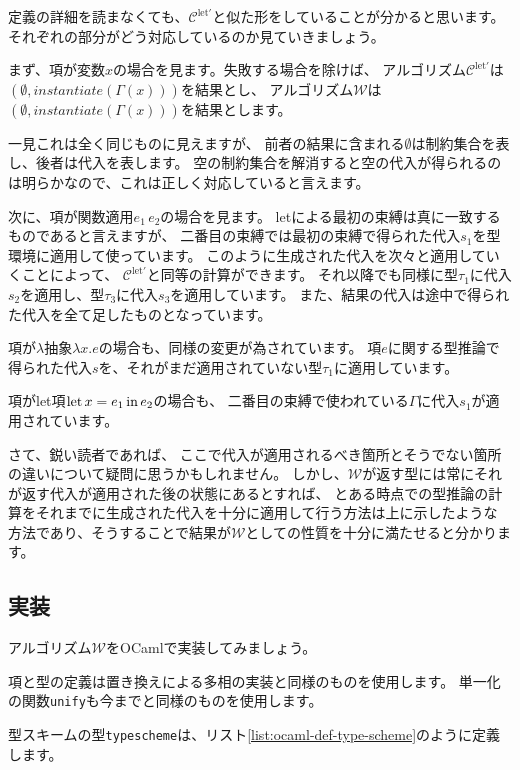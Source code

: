 定義の詳細を読まなくても、$\mathcal C^\mathrm{let'}$と似た形をしていることが分かると思います。
それぞれの部分がどう対応しているのか見ていきましょう。

まず、項が変数$x$の場合を見ます。失敗する場合を除けば、
アルゴリズム$\mathcal C^\mathrm{let'}$は$(\emptyset,\mathit{instantiate}(\Gamma(x)))$を結果とし、
アルゴリズム$\mathcal W$は$(\emptyset, \mathit{instantiate}(\Gamma(x)))$を結果とします。

一見これは全く同じものに見えますが、
前者の結果に含まれる$\emptyset$は制約集合を表し、後者は代入を表します。
空の制約集合を解消すると空の代入が得られるのは明らかなので、これは正しく対応していると言えます。

次に、項が関数適用$e_1 \, e_2$の場合を見ます。
letによる最初の束縛は真に一致するものであると言えますが、
二番目の束縛では最初の束縛で得られた代入$s_1$を型環境に適用して使っています。
このように生成された代入を次々と適用していくことによって、
$\mathcal C^\mathrm{let'}$と同等の計算ができます。
それ以降でも同様に型$\tau_1$に代入$s_2$を適用し、型$\tau_3$に代入$s_3$を適用しています。
また、結果の代入は途中で得られた代入を全て足したものとなっています。

項が$\lambda$抽象$\lambda x. e$の場合も、同様の変更が為されています。
項$e$に関する型推論で得られた代入$s$を、それがまだ適用されていない型$\tau_1$に適用しています。

項がlet項$\mathrm{let} \, x = e_1 \, \mathrm{in} \, e_2$の場合も、
二番目の束縛で使われている$\Gamma$に代入$s_1$が適用されています。

さて、鋭い読者であれば、
ここで代入が適用されるべき箇所とそうでない箇所の違いについて疑問に思うかもしれません。
しかし、$\mathcal W$が返す型には常にそれが返す代入が適用された後の状態にあるとすれば、
とある時点での型推論の計算をそれまでに生成された代入を十分に適用して行う方法は上に示したような
方法であり、そうすることで結果が$\mathcal W$としての性質を十分に満たせると分かります。

\subsection{実装}

アルゴリズム$\mathcal W$をOCamlで実装してみましょう。

項と型の定義は置き換えによる多相の実装と同様のものを使用します。
単一化の関数\texttt{unify}も今までと同様のものを使用します。

型スキームの型\texttt{typescheme}は、リスト\ref{list:ocaml-def-type-scheme}のように定義します。

